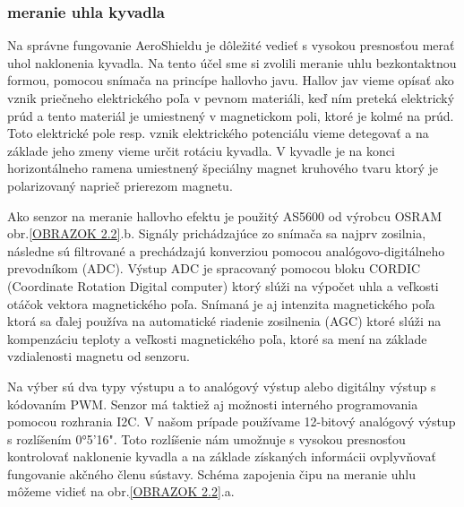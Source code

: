\label{Hall}
\pagebreak 

\subsubsection{meranie uhla kyvadla}
\label{meruhl}

Na správne fungovanie AeroShieldu je dôležité vedieť s vysokou presnosťou merať uhol naklonenia kyvadla. Na tento účel sme si zvolili meranie uhlu bezkontaktnou formou, pomocou snímača na princípe hallovho javu. Hallov jav vieme opísať ako vznik priečneho elektrického poľa v pevnom materiáli, keď ním preteká elektrický prúd a tento materiál je umiestnený v magnetickom poli, ktoré je kolmé na prúd\cite{Hall}. Toto elektrické pole resp. vznik elektrického potenciálu vieme detegovať a na základe jeho zmeny vieme určit rotáciu kyvadla. V kyvadle je na konci horizontálneho ramena umiestnený špeciálny magnet kruhového tvaru ktorý je polarizovaný naprieč prierezom magnetu.

Ako senzor na meranie hallovho efektu je použitý AS5600 od výrobcu OSRAM obr.\ref{OBRAZOK 2.2}.b. Signály prichádzajúce zo snímača sa najprv zosilnia, následne sú filtrované a prechádzajú konverziou pomocou analógovo-digitálneho prevodníkom (ADC). Výstup ADC je spracovaný pomocou bloku CORDIC (Coordinate Rotation Digital computer) ktorý slúži na výpočet uhla a veľkosti otáčok vektora magnetického poľa. Snímaná je aj intenzita magnetického poľa ktorá sa ďalej používa na
automatické riadenie zosilnenia (AGC) ktoré slúži na kompenzáciu teploty a veľkosti magnetického poľa, ktoré sa mení na základe vzdialenosti magnetu od senzoru.

Na výber sú dva typy výstupu a to analógový výstup alebo digitálny výstup s kódovaním PWM. Senzor má taktiež aj možnosti interného programovania pomocou rozhrania I2C. 
V našom prípade používame 12-bitový analógový výstup s rozlíšením 0°5'16". Toto rozlíšenie nám umožnuje s vysokou presnosťou kontrolovať naklonenie kyvadla a na základe získaných informácii ovplyvňovať fungovanie akčného členu sústavy. Schéma zapojenia čipu na meranie uhlu môžeme vidieť na obr.\ref{OBRAZOK 2.2}.a.


